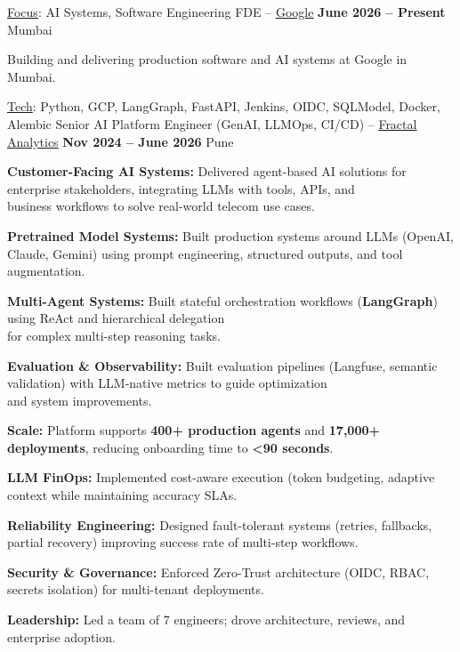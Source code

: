 \documentclass[11pt, a4paper]{awesome-cv}
\begin{document}
\vspace{-0.5em}
\begin{cventries}

\cventry
{\underline{Focus}: AI Systems, Software Engineering}
{FDE – \underline{\href{https://google.com/}{Google}}}
{\textbf{June 2026 – Present}}
{Mumbai}
{
\begin{cvitems}
    \item {Building and delivering production software and AI systems at Google in Mumbai.}
\end{cvitems}
}

\vspace{1.0em}

\cventry
{\underline{Tech}: Python, GCP, LangGraph, FastAPI, Jenkins, OIDC, SQLModel, Docker, Alembic}
{Senior AI Platform Engineer (GenAI, LLMOps, CI/CD) – \underline{\href{https://fractal.ai/}{Fractal Analytics}}}
{\textbf{Nov 2024 – June 2026}}
{Pune}
{
\begin{cvitems}
    \item {\textbf{Customer-Facing AI Systems:} Delivered agent-based AI solutions for enterprise stakeholders, integrating LLMs with tools, APIs, and \\ business workflows to solve real-world telecom use cases.}
    \item {\textbf{Pretrained Model Systems:} Built production systems around LLMs (OpenAI, Claude, Gemini) using prompt engineering, structured outputs, and tool augmentation.}
    \item {\textbf{Multi-Agent Systems:} Built stateful orchestration workflows (\textbf{LangGraph}) using ReAct and hierarchical delegation \\ for complex multi-step reasoning tasks.}
    \item {\textbf{Evaluation \& Observability:} Built evaluation pipelines (Langfuse, semantic validation) with LLM-native metrics to guide optimization \\ and system improvements.}
    \item {\textbf{Scale:} Platform supports \textbf{400+ production agents} and \textbf{17,000+ deployments}, reducing onboarding time to \textbf{<90 seconds}.}
    \item {\textbf{LLM FinOps:} Implemented cost-aware execution (token budgeting, adaptive context while maintaining accuracy SLAs.}
    \item {\textbf{Reliability Engineering:} Designed fault-tolerant systems (retries, fallbacks, partial recovery) improving success rate of multi-step workflows.}
    \item {\textbf{Security \& Governance:} Enforced Zero-Trust architecture (OIDC, RBAC, secrets isolation) for multi-tenant deployments.}
    \item {\textbf{Leadership:} Led a team of 7 engineers; drove architecture, reviews, and enterprise adoption.}
\end{cvitems}
}


\end{cventries}
\end{document}
